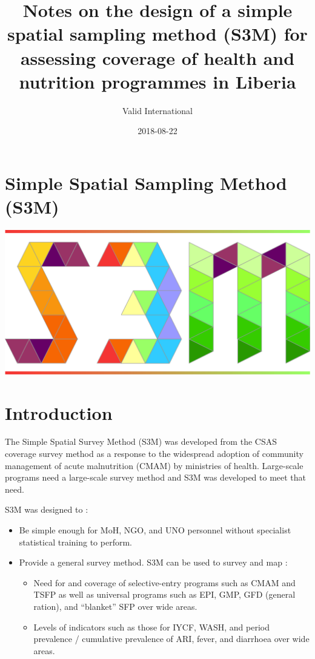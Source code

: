 \documentclass[12pt,a4paper]{book}
\title{Notes on the design of a simple spatial sampling method (S3M) for
assessing coverage of health and nutrition programmes in Liberia}
\author{Valid International}
\date{2018-08-22}
\theoremstyle{definition}
\theoremstyle{definition}
\theoremstyle{definition}
\theoremstyle{remark}
\begin{document}
\maketitle

{
\hypersetup{linkcolor=black}
\setcounter{tocdepth}{1}
\tableofcontents
}
\hypertarget{simple-spatial-sampling-method-s3m}{%
\chapter*{Simple Spatial Sampling Method
(S3M)}\label{simple-spatial-sampling-method-s3m}}

\includegraphics{figures/s3mlogo.png}

\hypertarget{introduction}{%
\chapter{Introduction}\label{introduction}}

The Simple Spatial Survey Method (S3M) was developed from the CSAS
coverage survey method as a response to the widespread adoption of
community management of acute malnutrition (CMAM) by ministries of
health. Large-scale programs need a large-scale survey method and S3M
was developed to meet that need.

S3M was designed to :

\begin{itemize}
\item
  Be simple enough for MoH, NGO, and UNO personnel without specialist
  statistical training to perform.
\item
  Provide a general survey method. S3M can be used to survey and map :

  \begin{itemize}
  \item
    Need for and coverage of selective-entry programs such as CMAM and
    TSFP as well as universal programs such as EPI, GMP, GFD (general
    ration), and ``blanket'' SFP over wide areas.
  \item
    Levels of indicators such as those for IYCF, WASH, and period
    prevalence / cumulative prevalence of ARI, fever, and diarrhoea over
    wide areas.
  \end{itemize}
\end{itemize}
\end{document}
